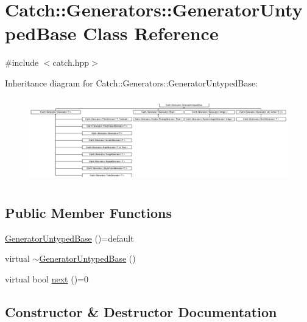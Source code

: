 \hypertarget{class_catch_1_1_generators_1_1_generator_untyped_base}{}\section{Catch\+:\+:Generators\+:\+:Generator\+Untyped\+Base Class Reference}
\label{class_catch_1_1_generators_1_1_generator_untyped_base}


{\ttfamily \#include $<$catch.\+hpp$>$}

Inheritance diagram for Catch\+:\+:Generators\+:\+:Generator\+Untyped\+Base\+:\begin{figure}[H]
\begin{center}
\leavevmode
\includegraphics[height=3.710843cm]{class_catch_1_1_generators_1_1_generator_untyped_base}
\end{center}
\end{figure}
\subsection*{Public Member Functions}
\begin{DoxyCompactItemize}
\item 
\mbox{\hyperlink{class_catch_1_1_generators_1_1_generator_untyped_base_a00ff0179d739c3016756b6cf56fabbad}{Generator\+Untyped\+Base}} ()=default
\item 
virtual \mbox{\hyperlink{class_catch_1_1_generators_1_1_generator_untyped_base_a6f05f8099fdc5744a7aff68aa8c09c7f}{$\sim$\+Generator\+Untyped\+Base}} ()
\item 
virtual bool \mbox{\hyperlink{class_catch_1_1_generators_1_1_generator_untyped_base_aeed3c0cd6233c5f553549e453b8d6638}{next}} ()=0
\end{DoxyCompactItemize}


\subsection{Constructor \& Destructor Documentation}
\mbox{\label{class_catch_1_1_generators_1_1_generator_untyped_base_a00ff0179d739c3016756b6cf56fabbad}} 
